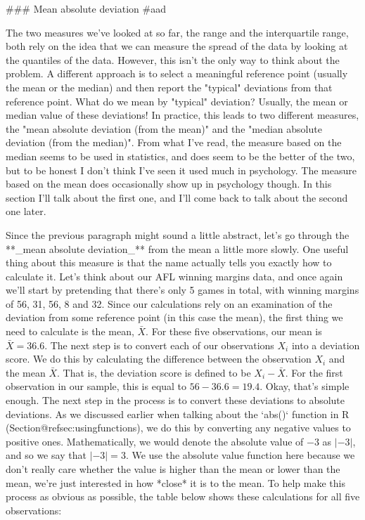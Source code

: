 ### Mean absolute deviation {#aad}

The two measures we've looked at so far, the range and the interquartile range, both rely on the idea that we can measure the spread of the data by looking at the quantiles of the data. However, this isn't the only way to think about the problem. A different approach is to select a meaningful reference point (usually the mean or the median) and then report the "typical" deviations from that reference point. What do we mean by "typical" deviation? Usually, the mean or median value of these deviations! In practice, this leads to two different measures, the "mean absolute deviation (from the mean)" and the "median absolute deviation (from the median)". From what I've read, the measure based on the median seems to be used in statistics, and does seem to be the better of the two, but to be honest I don't think I've seen it used much in psychology. The measure based on the mean does occasionally show up in psychology though. In this section I'll talk about the first one, and I'll come back to talk about the second one later.

Since the previous paragraph might sound a little abstract, let's go through the **_mean absolute deviation_** from the mean a little more slowly. One useful thing about this measure is that the name actually tells you exactly how to calculate it. Let's think about our AFL winning margins data, and once again we'll start by pretending that there's only 5 games in total, with winning margins of 56, 31, 56, 8 and 32. Since our calculations rely on an examination of the deviation from some reference point (in this case the mean), the first thing we need to calculate is the mean, $\bar{X}$. For these five observations, our mean is $\bar{X} = 36.6$. The next step is to convert each of our observations $X_i$ into a deviation score. We do this by calculating the difference between the observation $X_i$ and the mean $\bar{X}$. That is, the deviation score is defined to be $X_i - \bar{X}$. For the first observation in our sample, this is equal to $56 - 36.6 = 19.4$. Okay, that's simple enough. The next step in the process is to convert these deviations to absolute deviations. As we discussed earlier when talking about  the `abs()` function in R (Section@refsec:usingfunctions), we do this by converting any negative values to positive ones. Mathematically, we would denote the absolute value of $-3$ as $|-3|$, and so we say that $|-3| = 3$. We use the absolute value function here because we don't really care whether the value is higher than the mean or lower than the mean, we're just interested in how *close* it is to the mean. To help make this process as obvious as possible, the table below shows these calculations for all five observations:

